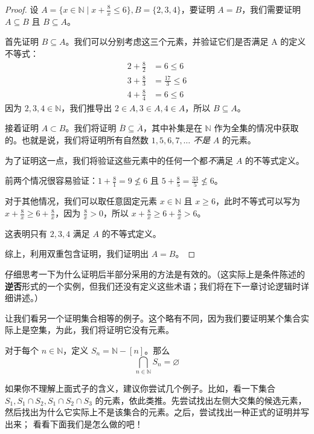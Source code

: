 \begin{proof}
    设 $A = \Big\{x \in \mathbb{N} \mid x + \frac{8}{x} \le 6\Big\}, B = \{2, 3, 4\}$，要证明 $A = B$，我们需要证明 $A \subseteq B$ 且 $B \subseteq A$。

    首先证明 $B \subseteq A$。我们可以分别考虑这三个元素，并验证它们是否满足 A 的定义不等式：
    \begin{align*}
        2 + \frac{8}{2} &= 6 \le 6 \\
        3 + \frac{8}{3} &= \frac{17}{3} \le 6 \\
        4 + \frac{8}{4} &= 6 \le 6
    \end{align*}
    因为 $2,3,4 \in \mathbb{N}$，我们推导出 $2 \in A, 3 \in A, 4 \in A$，所以 $B \subseteq A$。

    接着证明 $A \subset B$。我们将证明 $\overline{B} \subseteq \overline{A}$，其中补集是在 $\mathbb{N}$ 作为全集的情况中获取的。也就是说，我们将证明所有自然数 $1,5,6,7,\dots$ \emph{不是} $A$ 的元素。

    为了证明这一点，我们将验证这些元素中的任何一个都\emph{不}满足 $A$ 的不等式定义。

    前两个情况很容易验证：$1 + \frac{8}{1} = 9 \nleq 6$ 且 $5 + \frac{8}{5} = \frac{33}{5} \nleq 6$。

    对于其他情况，我们可以取任意固定元素 $x \in \mathbb{N}$ 且 $x \ge 6$，此时不等式可以写为 $x + \frac{8}{x} \ge 6 + \frac{8}{x}$，因为 $\frac{8}{x} > 0$，所以 $x + \frac{8}{x} \ge 6 + \frac{8}{x} > 6$。

    这表明只有 $2,3,4$ 满足 $A$ 的不等式定义。

    综上，利用双重包含证明，我们证明出 $A = B$。
\end{proof}

仔细思考一下为什么证明后半部分采用的方法是有效的。（这实际上是条件陈述的\textbf{逆否}形式的一个实例，但我们还没有定义这些术语；我们将在下一章讨论逻辑时详细讲述。）

让我们看另一个证明集合相等的例子。这个略有不同，因为我们要证明某个集合实际上是空集，为此，我们将证明它没有元素。

\begin{proposition}
    对于每个 $n \in \mathbb{N}$，定义 $S_n = \mathbb{N}-[n]$。那么
    \[\bigcap_{n \in \mathbb{N}}S_n = \varnothing\]
\end{proposition}

如果你不理解上面式子的含义，建议你尝试几个例子。比如，看一下集合 $S_1, S_1 \cap S_2, S_1 \cap S_2 \cap S_3$ 的元素，依此类推。先尝试找出左侧大交集的候选元素，然后找出为什么它实际上不是该集合的元素。之后，尝试找出一种正式的证明并写出来； 看看下面我们是怎么做的吧！

